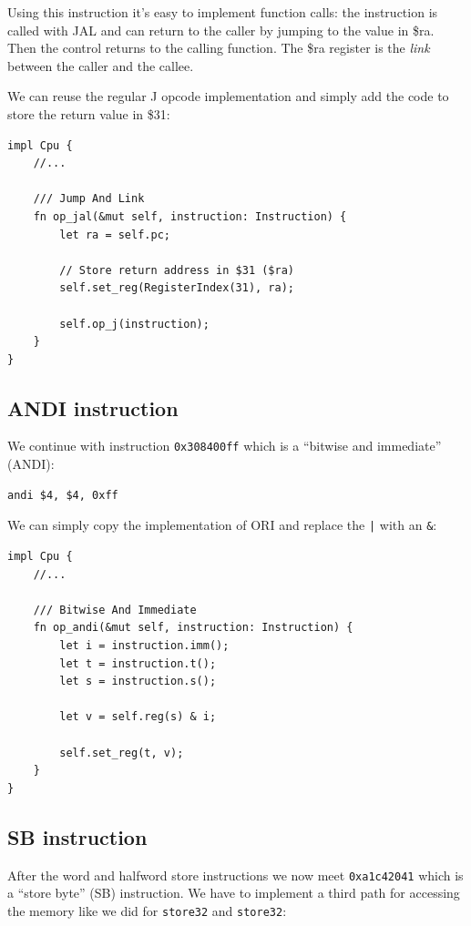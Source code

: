 \documentclass[a4paper]{article}
\newcommand{\code}[1] {\texttt{#1}}
\begin{document}
Using this instruction it's easy to implement function calls: the
instruction is called with JAL and can return to the caller by jumping
to the value in \$ra. Then the control returns to the calling
function. The \$ra register is the \emph{link} between the caller and
the callee.

We can reuse the regular J opcode implementation and simply add the
code to store the return value in \$31:

\begin{lstlisting}
impl Cpu {
    //...

    /// Jump And Link
    fn op_jal(&mut self, instruction: Instruction) {
        let ra = self.pc;

        // Store return address in $31 ($ra)
        self.set_reg(RegisterIndex(31), ra);

        self.op_j(instruction);
    }
}
\end{lstlisting}

\subsection{ANDI instruction}

We continue with instruction \code{0x308400ff} which is a ``bitwise
and immediate'' (ANDI):

\begin{lstlisting}[language=assembly]
andi $4, $4, 0xff
\end{lstlisting}

We can simply copy the implementation of ORI and replace the \code{|}
with an \code{\&}:

\begin{lstlisting}
impl Cpu {
    //...

    /// Bitwise And Immediate
    fn op_andi(&mut self, instruction: Instruction) {
        let i = instruction.imm();
        let t = instruction.t();
        let s = instruction.s();

        let v = self.reg(s) & i;

        self.set_reg(t, v);
    }
}
\end{lstlisting}

\subsection{SB instruction}

After the word and halfword store instructions we now meet
\code{0xa1c42041} which is a ``store byte'' (SB) instruction. We have
to implement a third path for accessing the memory like we did for
\code{store32} and \code{store32}:
\end{document}
